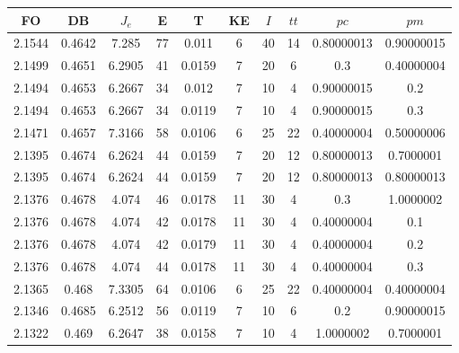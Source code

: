 \begin{table}[h!]
    \footnotesize
    \begin{center}
        \begin{tabular}{|c|c|c|c|c|c|c|c|c|c|}
        \hline
            {\bf FO} & {\bf DB} & $J_e$ & {\bf E} & {\bf T} & {\bf KE} & $I$ & $tt$ & $pc$ & $pm$ \\
        \hline
        \hline
            2.1544 & 0.4642  & 7.285 & 77 & 0.011 & 6 & 40 & 14 & 0.80000013 & 0.90000015\\
        \hline
        \hline
            2.1499 & 0.4651  & 6.2905 & 41 & 0.0159 & 7 & 20 & 6 & 0.3 & 0.40000004\\
        \hline
        \hline
            2.1494 & 0.4653  & 6.2667 & 34 & 0.012 & 7 & 10 & 4 & 0.90000015 & 0.2\\
        \hline
        \hline
            2.1494 & 0.4653  & 6.2667 & 34 & 0.0119 & 7 & 10 & 4 & 0.90000015 & 0.3\\
        \hline
        \hline
            2.1471 & 0.4657  & 7.3166 & 58 & 0.0106 & 6 & 25 & 22 & 0.40000004 & 0.50000006\\
        \hline
        \hline
            2.1395 & 0.4674  & 6.2624 & 44 & 0.0159 & 7 & 20 & 12 & 0.80000013 & 0.7000001\\
        \hline
        \hline
            2.1395 & 0.4674  & 6.2624 & 44 & 0.0159 & 7 & 20 & 12 & 0.80000013 & 0.80000013\\
        \hline
        \hline
            2.1376 & 0.4678  & 4.074 & 46 & 0.0178 & 11 & 30 & 4 & 0.3 & 1.0000002\\
        \hline
        \hline
            2.1376 & 0.4678  & 4.074 & 42 & 0.0178 & 11 & 30 & 4 & 0.40000004 & 0.1\\
        \hline
        \hline
            2.1376 & 0.4678  & 4.074 & 42 & 0.0179 & 11 & 30 & 4 & 0.40000004 & 0.2\\
        \hline
        \hline
            2.1376 & 0.4678  & 4.074 & 44 & 0.0178 & 11 & 30 & 4 & 0.40000004 & 0.3\\
        \hline
        \hline
            2.1365 & 0.468  & 7.3305 & 64 & 0.0106 & 6 & 25 & 22 & 0.40000004 & 0.40000004\\
        \hline
        \hline
            2.1346 & 0.4685  & 6.2512 & 56 & 0.0119 & 7 & 10 & 6 & 0.2 & 0.90000015\\
        \hline
        \hline
            2.1322 & 0.469  & 6.2647 & 38 & 0.0158 & 7 & 10 & 4 & 1.0000002 & 0.7000001\\

\end{tabular}
\end{center}
\end{table}
